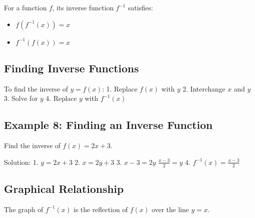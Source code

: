\documentclass[12pt]{article}
\begin{document}
For a function $f$, its inverse function $f^{-1}$ satisfies:
\begin{itemize}
    \item $f(f^{-1}(x)) = x$
    \item $f^{-1}(f(x)) = x$
\end{itemize}

\subsection{Finding Inverse Functions}

To find the inverse of $y = f(x)$:
1. Replace $f(x)$ with $y$
2. Interchange $x$ and $y$
3. Solve for $y$
4. Replace $y$ with $f^{-1}(x)$

\subsection{Example 8: Finding an Inverse Function}

Find the inverse of $f(x) = 2x + 3$.

Solution:
1. $y = 2x + 3$
2. $x = 2y + 3$
3. $x - 3 = 2y$
   $\frac{x - 3}{2} = y$
4. $f^{-1}(x) = \frac{x - 3}{2}$

\subsection{Graphical Relationship}

The graph of $f^{-1}(x)$ is the reflection of $f(x)$ over the line $y = x$.

\begin{center}
\end{center}
\end{document}
